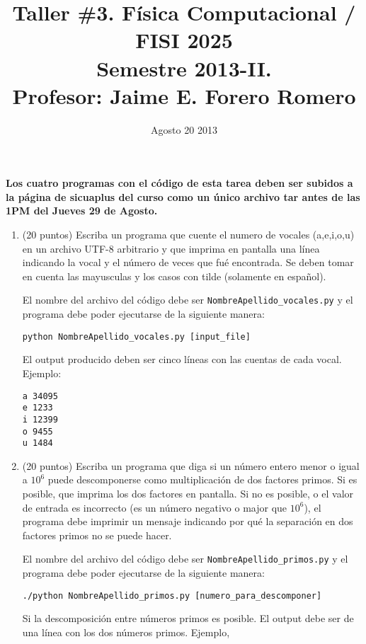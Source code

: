 \documentclass{article}
\title{Taller \#3. F\'isica Computacional / FISI 2025 \\Semestre 2013-II. \\ Profesor: Jaime E. Forero Romero}
\date{Agosto 20 2013}
\begin{document}
\maketitle

{\bf Los cuatro programas con el c\'odigo de esta tarea deben ser subidos a la p\'agina de sicuaplus del curso como un \'unico archivo tar antes de las 1PM del Jueves 29 de Agosto.}

\begin{enumerate}


\item (20 puntos) Escriba un programa que cuente el numero de vocales (a,e,i,o,u) en un archivo UTF-8 arbitrario y que imprima en pantalla una l\'inea indicando la vocal y el n\'umero de veces que fu\'e encontrada. Se deben tomar en cuenta las mayusculas y los casos con tilde (solamente en espa\~nol).

El nombre del archivo del c\'odigo debe ser \verb"NombreApellido_vocales.py" y el programa debe poder ejecutarse de la siguiente manera:

\begin{verbatim}
python NombreApellido_vocales.py [input_file]
\end{verbatim}

El output producido deben ser cinco l\'ineas con las cuentas de cada vocal. Ejemplo:

\begin{verbatim}
a 34095
e 1233
i 12399
o 9455
u 1484
\end{verbatim}

\item (20 puntos) Escriba un programa que diga si un n\'umero entero menor o igual a $10^6$ puede descomponerse como multiplicaci\'on de dos factores primos. Si es posible, que imprima los dos factores en pantalla. Si no es posible, o el valor de entrada es incorrecto (es un n\'umero negativo o major que $10^6$), el programa debe imprimir un mensaje indicando por qu\'e la separaci\'on en dos factores primos no se puede hacer.


El nombre del archivo del c\'odigo debe ser \verb"NombreApellido_primos.py" y el programa debe poder ejecutarse de la siguiente manera:

\begin{verbatim}
./python NombreApellido_primos.py [numero_para_descomponer]
\end{verbatim}

Si la descomposici\'on entre n\'umeros primos es posible. El output debe ser de una l\'inea con los dos n\'umeros primos. Ejemplo,


\end{enumerate}
\end{document}
